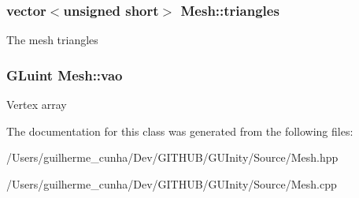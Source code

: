 \subsubsection[{triangles}]{\setlength{\rightskip}{0pt plus 5cm}vector$<$unsigned short$>$ Mesh\+::triangles}\label{class_mesh_ad41061e78a04735d509e548141d43a49}
The mesh triangles \hypertarget{class_mesh_a101a39d88bc5c8d33f0ebd6e77a60129}{}
\subsubsection[{vao}]{\setlength{\rightskip}{0pt plus 5cm}G\+Luint Mesh\+::vao}\label{class_mesh_a101a39d88bc5c8d33f0ebd6e77a60129}
Vertex array 

The documentation for this class was generated from the following files\+:\begin{DoxyCompactItemize}
\item 
/\+Users/guilherme\+\_\+cunha/\+Dev/\+G\+I\+T\+H\+U\+B/\+G\+U\+Inity/\+Source/Mesh.\+hpp\item 
/\+Users/guilherme\+\_\+cunha/\+Dev/\+G\+I\+T\+H\+U\+B/\+G\+U\+Inity/\+Source/Mesh.\+cpp\end{DoxyCompactItemize}
